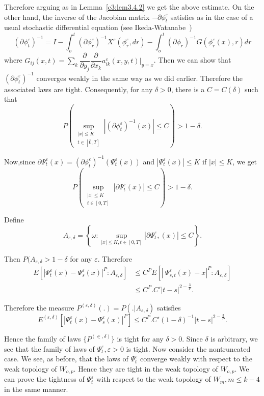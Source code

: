 Therefore arguing as in Lemma~\ref{c3:lem3.4.2} we get the above estimate. On
the other hand, the inverse of the Jacobian matrix $-\partial
\phi^\varepsilon_t$ satisfies as in the case of a usual stochastic
differential equation (see Ikeda-Watanabe~\cite{13}) 
$$
(\partial \phi^\varepsilon_t)^{-1} = I - \int^t_o (\partial
\phi^\varepsilon_r)^{-1} X^\varepsilon (\phi^\varepsilon_r, dr) -
\int^t_o (\partial \phi_r)^{-1} G (\phi^\varepsilon_r (x), r) dr 
$$
where $G_{ij}(x, t) = \sum\limits_k \dfrac{\partial}{\partial y_j}
\dfrac{\partial}{\partial x_k} a^\varepsilon_{ik} (x, y, t) 
|_{y = x}$. Then we can show that\break $(\partial \phi^\varepsilon_t )^{-1}$
converges weakly in the same way as we did earlier. Therefore the
associated laws are tight. Consequently, for any $\delta > 0$, there
is a $C = C(\delta)$ such that 
$$
P \left(\sup_{\substack{| x | \le K \\ t \in [\bar{0}, T]}} | 
(\partial \phi^\varepsilon_t)^{-1} (x) | \le C\right) > 1 -  \delta. 
$$

Now,\pageoriginale since $\partial \Psi^\varepsilon_t (x) = (\partial
\phi^\varepsilon_t)^{-1} (\Psi^\varepsilon_t (x))$ and $|
\Psi^\varepsilon_t (x) | \le K$ if $|x| \le K$, we get 
$$
P \left(\sup_{\substack{|x| \le K \\ t \in [0, T]}} | \partial
\Psi^\varepsilon_t (x) | \le C \right) > 1 - \delta. 
$$

Define
$$
A_{\varepsilon, \delta}  = \left\{\omega:  \sup_{|x| \le K, t \in
  [0, T]} | \partial \Psi^\varepsilon_t, (x) | \le C \right\}. 
$$

Then $P (A_{\varepsilon, \delta} > 1 - \delta$ for 
any $\varepsilon$. Therefore
\begin{align*}
  E \left[|\Psi^\varepsilon_t (x) - \Psi^\varepsilon_s (x) |^P:
    A_{\varepsilon, \delta}\right] & \le C^P E [| ~ \Psi^\varepsilon_{s,t}
    (x) - x |^P:  A_{\varepsilon, \delta}]\\ 
  & \le C^P.  C' |t - s|^{2-\frac{3}{P}}.
\end{align*}

Therefore the measure $P^{(\varepsilon, \delta)}(.) = P(. |
A_{\varepsilon, \delta})$ satisfies 
$$
E^{(\varepsilon, \delta)} [ | \Psi^\varepsilon_t (x) -
  \Psi^\varepsilon_s (x) |^P ] \le C^P.C'(1-\delta)^{-1} |t-s|^{2-
  \frac{3}{P}}. 
$$

Hence the family of laws $\{ P^{(\in, \delta)} \}$ is tight for
any $\delta > 0$. Since $\delta$ is arbitrary, we see that the family
of laws of $\Psi^\varepsilon_t, \varepsilon > 0$ is tight. Now
consider the nontruncated case. We see, as before, that the laws of
$\Psi^\varepsilon_t$ converge weakly with respect to the weak topology
of $W_{o, p}$. Hence they are tight in the weak topology of $W_{o,
p}$. We can prove the tightness of $\Psi^\varepsilon_t$ with respect
to the weak topology of $W_m, m \le k - 4$ in the same manner. 

